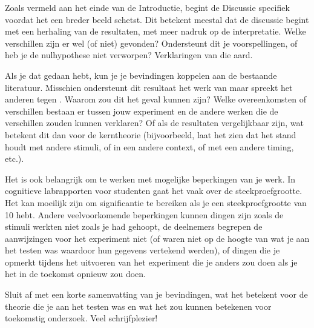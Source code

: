 \documentclass[stu,12pt,floatsintext]{apa7}
\begin{document}
Zoals vermeld aan het einde van de Introductie, begint de Discussie specifiek voordat het een breder beeld schetst. Dit betekent meestal dat de discussie begint met een herhaling van de resultaten, met meer nadruk op de interpretatie. Welke verschillen zijn er wel (of niet) gevonden? Ondersteunt dit je voorspellingen, of heb je de nulhypothese niet verworpen? Verklaringen van die aard.


Als je dat gedaan hebt, kun je je bevindingen koppelen aan de bestaande literatuur. Misschien ondersteunt dit resultaat het werk van \textcite{Contributor2023} maar spreekt het anderen tegen \parencite[bv.,][]{Sample2024}.  %
Waarom zou dit het geval kunnen zijn? Welke overeenkomsten of verschillen bestaan er tussen jouw experiment en de andere werken die de verschillen zouden kunnen verklaren? Of als de resultaten vergelijkbaar zijn, wat betekent dit dan voor de kerntheorie (bijvoorbeeld, laat het zien dat het stand houdt met andere stimuli, of in een andere context, of met een andere timing, etc.).

Het is ook belangrijk om te werken met mogelijke beperkingen van je werk. In cognitieve labrapporten voor studenten gaat het vaak over de steekproefgrootte. Het kan moeilijk zijn om significantie te bereiken als je een steekproefgrootte van 10 hebt. Andere veelvoorkomende beperkingen kunnen dingen zijn zoals de stimuli werkten niet zoals je had gehoopt, de deelnemers begrepen de aanwijzingen voor het experiment niet (of waren niet op de hoogte van wat je aan het testen was waardoor hun gegevens vertekend werden), of dingen die je opmerkt tijdens het uitvoeren van het experiment die je anders zou doen als je het in de toekomst opnieuw zou doen.

Sluit af met een korte samenvatting van je bevindingen, wat het betekent voor de theorie die je aan het testen was en wat het zou kunnen betekenen voor toekomstig onderzoek. 
Veel schrijfplezier!


\printbibliography
\end{document}
